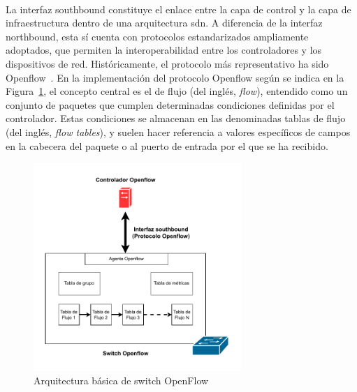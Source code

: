 \\
La interfaz southbound constituye el enlace entre la capa de control y la capa de infraestructura dentro de una arquitectura \gls{sdn}. A diferencia de la interfaz northbound, esta sí cuenta con protocolos estandarizados ampliamente adoptados, que permiten la interoperabilidad entre los controladores y los dispositivos de red. Históricamente, el protocolo más representativo ha sido Openflow~\cite{mckeown2008openflow}. En la implementación del protocolo Openflow según se indica en la Figura~\ref{fig:sdn_openflow}, el concepto central es el de flujo (del inglés, \textit{flow}), entendido como un conjunto de paquetes que cumplen determinadas condiciones definidas por el controlador. Estas condiciones se almacenan en las denominadas tablas de flujo (del inglés, \textit{flow tables}), y suelen hacer referencia a valores específicos de campos en la cabecera del paquete o al puerto de entrada por el que se ha recibido.

\begin{figure}[ht!]
\centering
\includegraphics[width=0.7\textwidth]{fig/02_sota/sota_3_sdn_openflow.drawio.pdf}
\caption{Arquitectura básica de switch OpenFlow}
\label{fig:sdn_openflow}
\end{figure}

